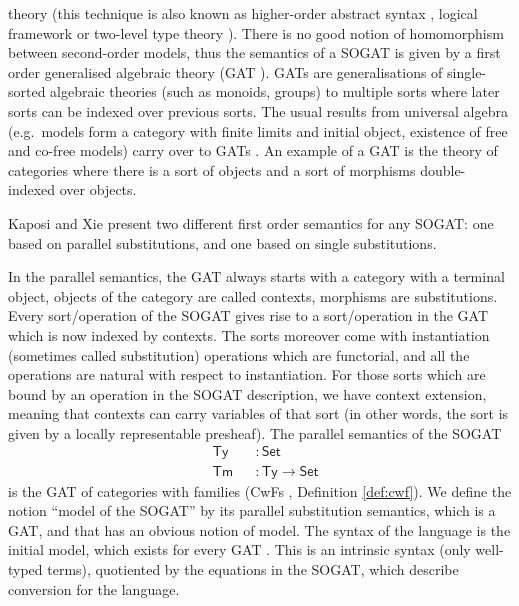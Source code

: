 \documentclass[sigplan,10pt,anonymous,review]{acmart}\settopmatter{printfolios=true,printccs=false,printacmref=false}
\newcommand{\ra}{\rightarrow}
\newcommand{\Set}{\mathsf{Set}}
\newcommand{\Ty}{\mathsf{Ty}}
\newcommand{\Tm}{\mathsf{Tm}}
\begin{document}
theory (this technique is also known as higher-order abstract syntax
\cite{DBLP:conf/lics/Hofmann99}, logical framework
\cite{DBLP:journals/jacm/HarperHP93,10.1007/978-3-642-14203-1_2} or
two-level type theory \cite{DBLP:conf/csl/AltenkirchCK16,DBLP:journals/mscs/AnnenkovCKS23}). There is no good notion of homomorphism between
second-order models, thus the semantics of a SOGAT is given by a first
order generalised algebraic theory (GAT
\cite{DBLP:journals/apal/Cartmell86}). GATs are generalisations of
single-sorted algebraic theories (such as monoids, groups) to multiple
sorts where later sorts can be indexed over previous sorts. The usual
results from universal algebra (e.g.\ models form a category with
finite limits and initial object, existence of free and co-free
models) carry over to GATs \cite{andras,DBLP:phd/hal/Moeneclaey22}. An
example of a GAT is the theory of categories where there is a sort of
objects and a sort of morphisms double-indexed over objects.

Kaposi and Xie \cite{DBLP:conf/fscd/KaposiX24} present two different
first order semantics for any SOGAT: one based on parallel
substitutions, and one based on single substitutions.

In the parallel semantics, the GAT always starts with a category with
a terminal object, objects of the category are called contexts,
morphisms are substitutions. Every sort/operation of the SOGAT gives
rise to a sort/operation in the GAT which is now indexed by
contexts. The sorts moreover come with instantiation (sometimes
called substitution) operations which are functorial, and all the
operations are natural with respect to instantiation. For those sorts
which are bound by an operation in the SOGAT description, we have
context extension, meaning that contexts can carry variables of that
sort (in other words, the sort is given by a locally representable
presheaf). The parallel semantics of the SOGAT
\begin{equation}\label{eq:tytm}
\begin{alignedat}{10}
  & \Ty && : \Set \\
  & \Tm && : \Ty \ra\Set 
\end{alignedat}
\end{equation}
is the GAT of categories with families (CwFs
\cite{DBLP:conf/types/Dybjer95,Castellan2021}, Definition \ref{def:cwf}).
We define the notion ``model of the SOGAT'' by its parallel substitution
semantics, which is a GAT, and that has an obvious notion of model. The
syntax of the language is the initial model, which exists for every
GAT \cite{DBLP:journals/pacmpl/KaposiKA19}. This is an intrinsic
syntax (only well-typed terms), quotiented by the equations in the
SOGAT, which describe conversion for the language.
\end{document}
